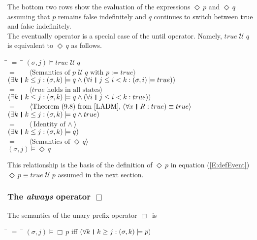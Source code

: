 \documentclass[fleqn, leqno]{article}
\newcommand{\lgap}{2pt}                             %
\newcommand{\mymathindent}{24pt}                    %
\newcommand{\Until}{\;\mathcal{U}\;}
\newcommand{\Event}{\Diamond\,}
\newcommand{\Always}{\Box\,}
\newcommand{\thedr}{\rule[-.25ex]{.32mm}{1.75ex}}   %
\newcommand{\dr}{\;\,\thedr\,\;}                    %
\newcommand{\rb}{:}                                 %
\newcommand{\all}{\forall}                          %
\newcommand{\ext}{\exists}                          %
\newcommand{\Gll} {\langle}                         %
\newcommand{\Ggg} {\rangle}                         %
\newcommand{\Hint}[1]     {\ \ \ $\Gll              \mbox{#1} \Ggg$ }   %
\begin{document}
The bottom two rows show the evaluation of the expressions $\Event p$ and $\Event q$
assuming that $p$ remains false indefinitely and $q$ continues to switch between true and false indefinitely.\\

The eventually operator is a special case of the until operator.
Namely, $true \Until q$ is equivalent to $\Event q$ as follows.

\begin{tabbing}
\hspace{\mymathindent} \= $= \;$ \= \kill
	\> \>   $(\sigma, j) \models true\Until q$\\[\lgap]
	\> $=$  \>  \Hint{Semantics of $p\Until q$ with $p:=true$}\\[\lgap]
	\> \>   $(\ext k \dr k \le j \rb (\sigma,k) \models q \land (\all i \dr j\le i < k \rb (\sigma,i) \models true))$\\[\lgap]
	\> $=$  \>  \Hint{$true$ holds in all states}\\[\lgap]
	\> \>   $(\ext k \dr k \le j \rb (\sigma,k) \models q \land (\all i \dr j\le i < k \rb true))$\\[\lgap]
	\> $=$  \>  \Hint{Theorem (9.8) from \cite{LADM}, $(\all x\dr R\rb true)\equiv true$}\\[\lgap]
	\> \>   $(\ext k \dr k \le j \rb (\sigma,k) \models q \land true)$\\[\lgap]
	\> $=$  \>  \Hint{Identity of $\land$}\\[\lgap]
	\> \>   $(\ext k \dr k \le j \rb (\sigma,k) \models q)$\\[\lgap]
	\> $=$  \>  \Hint{Semantics of $\Event q$}\\[\lgap]
	\> \>   $(\sigma, j) \models \Event q$
\end{tabbing}

This relationship is the basis of the definition of $\Event p$ in equation (\ref{E:defEvent}) $\Event p \equiv true \Until p$
assumed in the next section.

\subsubsection*{The \textit{always} operator $\Always$}

The semantics of the unary prefix operator $\Always$ is

\begin{tabbing}
\hspace{\mymathindent} \= $= \;$ \= \kill
  \> $(\sigma, j) \models \Always p$ \quad iff \quad $(\all k \dr k \ge j \rb (\sigma,k) \models p)$
\end{tabbing}
\end{document}

